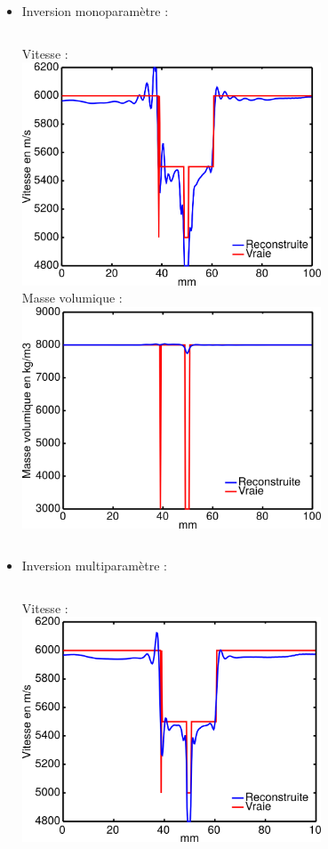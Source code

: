 \documentclass[10pt,xcolor=x11names,compress, notes=show]{beamer}%
\begin{document}
\begin{frame}
\begin{itemize}
	\item Inversion monoparamètre : \\[0.2cm]
	\begin{columns}
		\centering
		Vitesse : \\[0.2cm]
		\includegraphics[width=0.7\textwidth]{img/multi/coupe_vp_mono_smooth_hor.png}\\
		\centering
		Masse volumique  : \\[0.2cm]
		\includegraphics[width=0.7\textwidth]{img/multi/coupe_rho_mono.png}\\
	\end{columns}
	\item Inversion multiparamètre : \\[0.2cm]
	\begin{columns}
		\column{0.5\textwidth}
		\centering
		Vitesse : \\[0.2cm]
		\includegraphics[width=0.7\textwidth]{img/multi/coupe_vp_multi.png}\\

\end{columns}
\end{itemize}
\end{frame}
\end{document}
